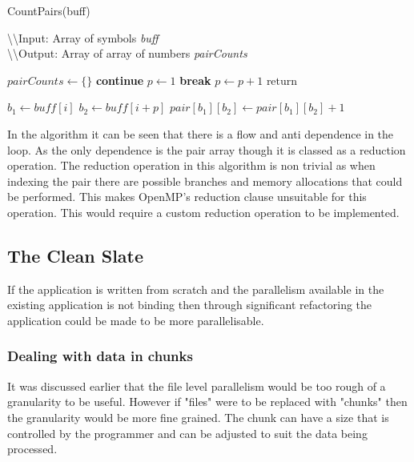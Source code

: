 \documentclass{article}
\begin{document}
\begin{algorithm}[H]
    \caption{CountPairs(buff)} \label{alg:countpairs}
    \textbackslash \textbackslash Input: Array of symbols \textit{buff} \\
    \textbackslash \textbackslash Output: Array of array of numbers \textit{pairCounts}
    \begin{algorithmic}[1]
        \State $pairCounts \gets \{\}$
                \State \textbf{continue}
            \EndIf
            \State $p \gets 1$
                    \State \textbf{break}
                \EndIf
                \State $p \gets p + 1$ 
            \EndWhile
                \State $\text{return} {}$
            \EndIf

            \State $b_1 \gets buff[i]$
            \State $b_2 \gets buff[i+p]$
            \State $pair[b_1][b_2] \gets pair[b_1][b_2] + 1$
        \EndFor
    \end{algorithmic}
\end{algorithm}

In the algorithm it can be seen that there is a flow and anti dependence in the loop.
As the only dependence is the pair array though it is classed as a reduction operation.
The reduction operation in this algorithm is non trivial as when indexing the pair there are 
possible branches and memory allocations that could be performed. This makes OpenMP's reduction clause
unsuitable for this operation. This would require a custom reduction operation to be implemented.

\subsection{The Clean Slate}

If the application is written from scratch and the parallelism available in the existing application is not
binding then through significant refactoring the application could be made to be more parallelisable.

\subsubsection{Dealing with data in chunks}
It was discussed earlier that the file level parallelism would be too rough of a granularity to be useful.
However if "files" were to be replaced with "chunks" then the granularity would be more fine grained. The chunk
can have a size that is controlled by the programmer and can be adjusted to suit the data being processed.
\end{document}
